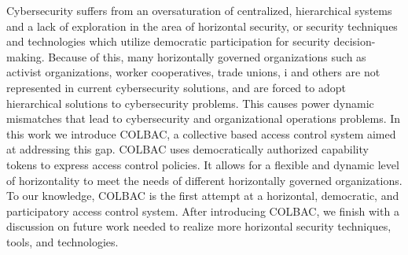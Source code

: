 Cybersecurity suffers from an oversaturation of centralized, hierarchical
systems and a lack of exploration in the area of horizontal security, or
security techniques and technologies which utilize democratic participation for
security decision-making. Because of this, many horizontally governed
organizations such as activist organizations, worker cooperatives, trade unions, i
and others are not represented in current cybersecurity solutions, and are
forced to adopt hierarchical solutions to cybersecurity problems. This causes
power dynamic mismatches that lead to cybersecurity and organizational
operations problems. In this work we introduce COLBAC, a collective based access
control system aimed at addressing this gap. COLBAC uses democratically
authorized capability tokens to express access control policies. It allows for
a flexible and dynamic level of horizontality to meet the needs of different
horizontally governed organizations. To our knowledge, COLBAC is the first
attempt at a horizontal, democratic, and participatory  access control system.
After introducing COLBAC, we finish with a discussion on future work needed to
realize more horizontal security techniques, tools, and technologies.
